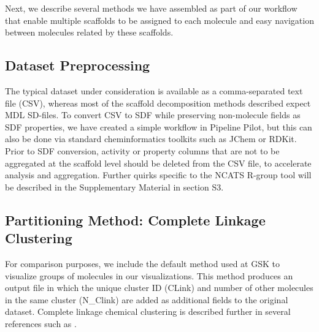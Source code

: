 \documentclass[journal=jacsat,manuscript=article]{achemso}
\newcommand*\tref[1]{Table~\ref{table:#1}}
\begin{document}

Next, we describe several methods we have assembled as part of our
workflow that enable multiple scaffolds to be assigned to each
molecule and easy navigation between molecules related by these
scaffolds.


\subsection{Dataset Preprocessing}
\label{sec:prepro}
The typical dataset under consideration is available as a
comma-separated text file (CSV), whereas most of the scaffold
decomposition methods described expect MDL SD-files. To convert CSV to
SDF while preserving non-molecule fields as SDF properties, we have
created a simple workflow in Pipeline Pilot\cite{PPilot}, but this can also be done
via standard cheminformatics toolkits such as JChem\cite{JChem} or RDKit\cite{RDKit}. Prior to
SDF conversion, activity or property columns that are not to be
aggregated at the scaffold level should be deleted from the CSV file,
to accelerate analysis and aggregation.  Further quirks specific to the NCATS R-group tool
will be described in the Supplementary Material in section S3.

\subsection{Partitioning Method: Complete Linkage Clustering}
For comparison purposes, we include the default method used at GSK to visualize groups of
molecules in our visualizations. This
method produces an output file in which the unique cluster ID (CLink)
and number of other molecules in the same cluster (N\_Clink) are added
as additional fields to the original dataset.  Complete linkage
chemical clustering is described further in several references such
as \citet{Jain2010,Downs2003}.
\end{document}
